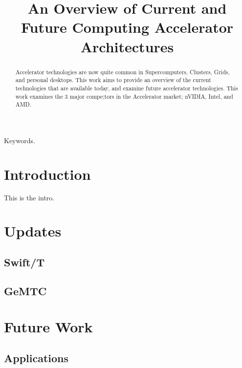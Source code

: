 \documentclass[conference]{IEEEtran}
\begin{document}
%
\title{An Overview of Current and Future Computing Accelerator Architectures}


\author{
}


\maketitle

\begin{abstract}
Accelerator technologies are now quite common in Supercomputers, Clusters, Grids, and personal desktops. This work aims to provide an overview of the current technologies that are available today, and examine future accelerator technologies. This work examines the 3 major compe;tors in the Accelerator market; nVIDIA, Intel, and AMD.
\end{abstract}

\begin{IEEEkeywords}
Keywords.
\end{IEEEkeywords}

\IEEEpeerreviewmaketitle

\section{Introduction}
This is the intro. \cite{kriederSC12}

\section{Updates}

\subsection{Swift/T}

\subsection{GeMTC}

\section{Future Work}

\subsection{Applications}



\end{document}
